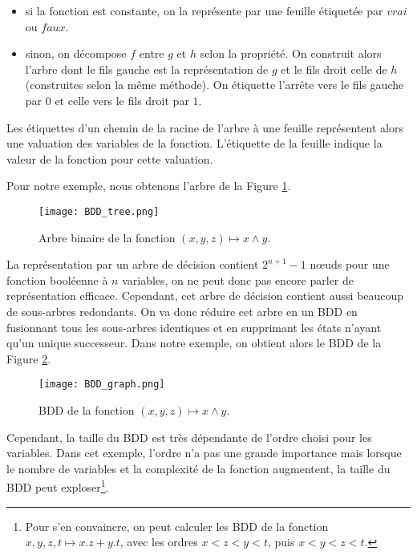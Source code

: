 \begin{itemize}
\item
  si la fonction est constante, on la représente par une feuille
  étiquetée par \(vrai\) ou \(faux\).
\item
  sinon, on décompose \(f\) entre \(g\) et \(h\) selon la propriété. On
  construit alors l'arbre dont le fils gauche est la représentation de
  \(g\) et le fils droit celle de \(h\) (construites selon la même méthode).
  On étiquette l'arrête vers le fils gauche par \(0\) et celle vers le fils
  droit par \(1\).
\end{itemize}

Les étiquettes d'un chemin de la racine de l'arbre à une feuille représentent
alors une valuation des variables de la fonction. L'étiquette de la feuille
indique la valeur de la fonction pour cette valuation.

Pour notre exemple, nous obtenons l'arbre de la Figure \ref{fig:BDD_tree}.

\begin{figure}[ht!]
\begin{center}
  \texttt{[image: BDD\_tree.png]}
\end{center}
\caption{Arbre binaire de la fonction \((x,y,z) \mapsto x \land y\).}
\label{fig:BDD_tree}
\end{figure}

La représentation par un arbre de décision contient \(2^{n+1} - 1\) nœuds pour
une fonction booléenne à \(n\) variables, on ne peut donc pas encore parler de
représentation efficace. Cependant, cet arbre de décision contient aussi
beaucoup de sous-arbres redondants. On va donc réduire cet arbre en un BDD en
fusionnant tous les sous-arbres identiques et en supprimant les états n'ayant
qu'un unique successeur. Dans notre exemple, on obtient alors le BDD de la
Figure \ref{fig:BDD_graph}.

\begin{figure}[h]
\begin{center}
\texttt{[image: BDD\_graph.png]}
\end{center}
\caption{BDD de la fonction \((x,y,z) \mapsto x \land y\).}
\label{fig:BDD_graph}
\end{figure}

Cependant, la taille du BDD est très dépendante de l'ordre choisi pour
les variables\cite{OBDD}. Dans cet exemple, l'ordre n'a pas une grande importance
mais lorsque le nombre de variables et la complexité de la fonction
augmentent, la taille du BDD peut exploser\footnote{Pour s'en
  convaincre, on peut calculer les BDD de la fonction
  \(x, y, z, t \mapsto x.z + y.t\), avec les ordres \(x<z<y<t\), puis
  \(x<y<z<t\).}.

